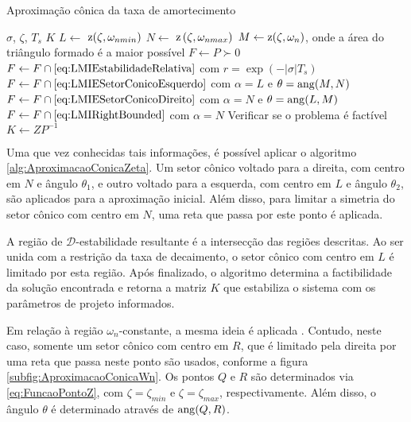\begin{algorithm}[ht!]
  \caption{Aproximação cônica da taxa de amortecimento}\label{alg:AproximacaoConicaZeta}
  \begin{algorithmic}[1]
    \Require $\sigma$, $\zeta$, $T_s$
    \Ensure $K$
    \State $L \gets $ $\operatorname{\mathrm{z}}(\zeta,\omega_{nmin})$
    \State $N \gets $ $\operatorname{\mathrm{z}}\left(\zeta,\omega_{nmax}\right)$
    \State $M \gets \operatorname{\mathrm{z}}(\zeta,\omega_n)$, onde a área do triângulo formado é a maior possível
    \State $F \gets P \succ 0$
    \State $F \gets F \cap \eqref{eq:LMIEstabilidadeRelativa}$ com $r = \exp{\left(-|\sigma|T_s\right)}$ 
    \State $F \gets F \cap \eqref{eq:LMIESetorConicoEsquerdo}$ com $\alpha = L$ e $\theta = \operatorname{ang}(M,N)$ 
    \State $F \gets F \cap \eqref{eq:LMIESetorConicoDireito}$ com $\alpha = N$ e $\theta = \operatorname{ang}(L,M)$ 
    \State $F \gets F \cap \eqref{eq:LMIRightBounded}$ com $\alpha = N$  
    \State Verificar se o problema é factível
    \State $K \gets ZP^{-1}$
  \end{algorithmic}
\end{algorithm}

Uma que vez conhecidas tais informações, é possível aplicar o algoritmo \ref{alg:AproximacaoConicaZeta}. Um setor cônico voltado para a direita, com centro em $N$ e ângulo $\theta_1$, e outro voltado para a esquerda, com centro em $L$ e ângulo $\theta_2$, são aplicados para a aproximação inicial. Além disso, para limitar a simetria do setor cônico com centro em $N$, uma reta que passa por este ponto é aplicada.

A região de $\mathscr{D}$-estabilidade resultante é a intersecção das regiões descritas. Ao ser unida com a restrição da taxa de decaimento, o setor cônico com centro em $L$ é limitado por esta região. Após finalizado, o algoritmo determina a factibilidade da solução encontrada e retorna a matriz $K$ que estabiliza o sistema com os parâmetros de projeto informados.

Em relação à região $\omega_n$-constante, a mesma ideia é aplicada \cite{CHIQUETO2021}. Contudo, neste caso, somente um setor cônico com centro em $R$, que é limitado pela direita por uma reta que passa neste ponto são usados, conforme a figura \ref{subfig:AproximacaoConicaWn}. Os pontos $Q$ e $R$ são determinados via \eqref{eq:FuncaoPontoZ}, com $\zeta = \zeta_{min}$ e $\zeta = \zeta_{max}$, respectivamente. Além disso, o ângulo $\theta$ é determinado através de $\operatorname{ang}(Q,R)$.  

